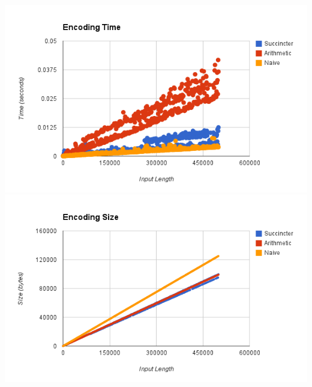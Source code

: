 \documentclass{article}
\begin{document}
\includegraphics[scale=0.8]{images/encoding_time}\\
\includegraphics[scale=0.8]{images/encoding_size}\\
\end{document}
